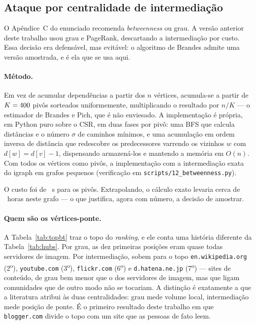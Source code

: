 \documentclass[sigconf]{webmedia}
\begin{document}
\subsection{Ataque por centralidade de intermediação}
\label{sec:betweenness}

O Apêndice~C do enunciado recomenda \textit{betweenness} ou grau. A
versão anterior deste trabalho usou grau e PageRank, descartando a
intermediação por custo. Essa decisão era defensável, mas evitável: o
algoritmo de Brandes admite uma versão amostrada, e é ela que se usa
aqui.

\paragraph{Método.} Em vez de acumular dependências a partir dos $n$
vértices, acumula-se a partir de $K = 400{}$ pivôs sorteados
uniformemente, multiplicando o resultado por $n/K$ --- o estimador de
Brandes e Pich, que é não enviesado. A implementação é própria, em
Python puro sobre o CSR, em duas fases por pivô: uma BFS que calcula
distâncias e o número $\sigma$ de caminhos mínimos, e uma acumulação em
ordem inversa de distância que redescobre os predecessores varrendo os
vizinhos $w$ com $d[w] = d[v]-1$, dispensando armazená-los e mantendo a
memória em $O(n)$. Com todos os vértices como pivôs, a implementação
\btValidacao{} com a intermediação exata do igraph em grafos pequenos
(verificação em \texttt{scripts/12\_betweenness.py}).

O custo foi de \btTempo{}~s para os \btK{} pivôs. Extrapolando, o cálculo
exato levaria cerca de \btTempoExato{}~horas neste grafo --- o que
justifica, agora com número, a decisão de amostrar.

\paragraph{Quem são os vértices-ponte.} A Tabela~\ref{tab:topbt} traz o
topo do \textit{ranking}, e ele conta uma história diferente da
Tabela~\ref{tab:hubs}. Por grau, as dez primeiras posições eram quase
todas servidores de imagem. Por intermediação, sobem para o topo
\texttt{en.wikipedia.org} (2\textsuperscript{o}),
\texttt{youtube.com} (3\textsuperscript{o}), \texttt{flickr.com}
(6\textsuperscript{o}) e \texttt{d.hatena.ne.jp}
(7\textsuperscript{o}) --- sites de conteúdo, de grau bem menor que o
dos servidores de imagem, mas que ligam comunidades que de outro modo
não se tocariam. A distinção é exatamente a que a literatura atribui às
duas centralidades: grau mede volume local, intermediação mede posição
de ponte. É o primeiro resultado deste trabalho em que
\texttt{blogger.com} divide o topo com um site que as pessoas de fato
leem.
\end{document}
